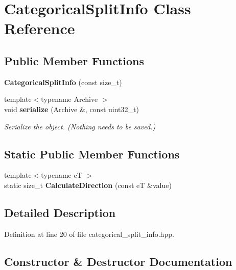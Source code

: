 \section{Categorical\+Split\+Info Class Reference}
\label{classmlpack_1_1tree_1_1CategoricalSplitInfo}
\subsection*{Public Member Functions}
\begin{DoxyCompactItemize}
\item 
\textbf{ Categorical\+Split\+Info} (const size\+\_\+t)
\item 
{\footnotesize template$<$typename Archive $>$ }\\void \textbf{ serialize} (Archive \&, const uint32\+\_\+t)
\begin{DoxyCompactList}\small\item\em Serialize the object. (Nothing needs to be saved.) \end{DoxyCompactList}\end{DoxyCompactItemize}
\subsection*{Static Public Member Functions}
\begin{DoxyCompactItemize}
\item 
{\footnotesize template$<$typename eT $>$ }\\static size\+\_\+t \textbf{ Calculate\+Direction} (const eT \&value)
\end{DoxyCompactItemize}


\subsection{Detailed Description}


Definition at line 20 of file categorical\+\_\+split\+\_\+info.\+hpp.



\subsection{Constructor \& Destructor Documentation}
\mbox{\label{classmlpack_1_1tree_1_1CategoricalSplitInfo_ad287444a06299e946a7d16b47b0f656e}} 
